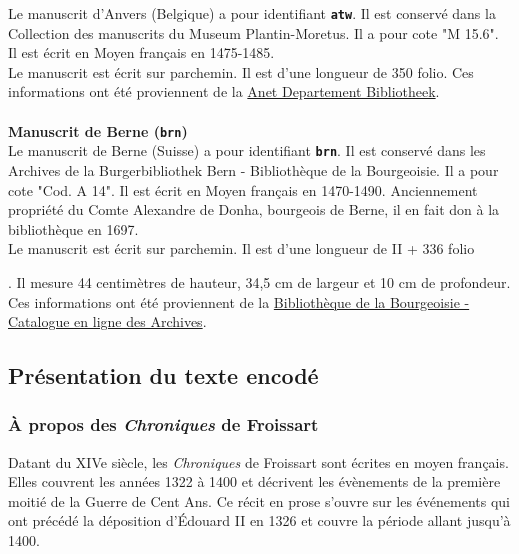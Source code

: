 \documentclass[12pt, a4paper]{article}
\begin{document}
         \indent Le manuscrit d'Anvers (Belgique) a pour identifiant \textbf{\texttt{atw}}. Il est conservé dans la Collection des manuscrits du  Museum Plantin-Moretus. Il a pour cote "M 15.6". Il est écrit en Moyen français en 1475-1485.\\ \indent Le manuscrit est écrit sur parchemin. Il est d'une longueur de 350 folio. Ces informations ont été proviennent de la \href{https://anet.be/record/opacmpm/c:lvd:14057240/F}{Anet Departement Bibliotheek}.\\~\\\noindent \textbf{Manuscrit de Berne (\texttt{brn})}\\
            
         \indent Le manuscrit de Berne (Suisse) a pour identifiant \textbf{\texttt{brn}}. Il est conservé dans les Archives de la  Burgerbibliothek Bern - Bibliothèque de la Bourgeoisie. Il a pour cote "Cod. A 14". Il est écrit en Moyen français en 1470-1490. Anciennement propriété du Comte Alexandre de Donha, bourgeois de Berne, il en fait don à la bibliothèque en 1697.\\ \indent Le manuscrit est écrit sur parchemin. Il est d'une longueur de II + 336 folio
                      
                    . Il mesure 44 centimètres de hauteur, 34,5 cm de largeur et 10 cm de profondeur. Ces informations ont été proviennent de la \href{http://katalog.burgerbib.ch/detail.aspx?ID=147296}{Bibliothèque de la Bourgeoisie - Catalogue en ligne des Archives}.
                \subsection{Présentation du texte encodé}
                
        
        \subsubsection{À propos des \textit{Chroniques} de Froissart}
        Datant du XIVe siècle, les \textit{Chroniques} de Froissart sont écrites en moyen français. Elles couvrent les années 1322 à 1400 et décrivent les évènements de la première moitié de la Guerre de Cent Ans.
          Ce récit en prose s'ouvre sur les événements qui ont précédé la déposition d'Édouard II en 1326 et couvre la période allant jusqu'à 1400.\\ \indent 
        
\end{document}
